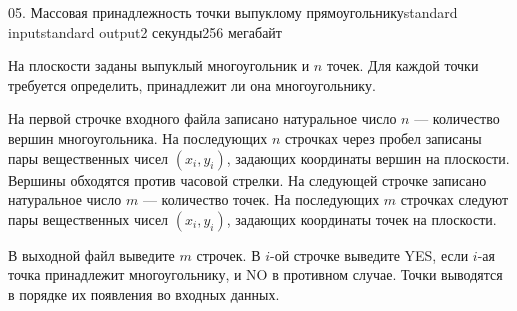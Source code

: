 \begin{problem}{05. Массовая принадлежность точки выпуклому прямоугольнику}{standard input}{standard output}{2 секунды}{256 мегабайт}

На плоскости заданы выпуклый многоугольник и $n$ точек. Для каждой точки требуется определить, принадлежит ли она многоугольнику.

\InputFile

На первой строчке входного файла записано натуральное число $n$ --- количество вершин многоугольника. На последующих $n$ строчках через пробел записаны пары вещественных чисел $(x_i, y_i)$, задающих координаты вершин на плоскости. Вершины обходятся против часовой стрелки. На следующей строчке записано натуральное число $m$ --- количество точек. На последующих $m$ строчках следуют пары вещественных чисел $(x_i, y_i)$, задающих координаты точек на плоскости.

\OutputFile

В выходной файл выведите $m$ строчек. В $i$-ой строчке выведите YES, если $i$-ая точка принадлежит многоугольнику, и NO в противном случае. Точки выводятся в порядке их появления во входных данных.

\Examples

\begin{example}%
%
\end{example}

\end{problem}
